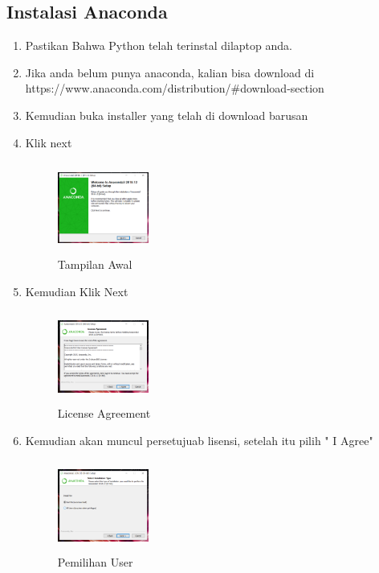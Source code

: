 \subsection{Instalasi Anaconda}
\begin{enumerate}
    \item Pastikan Bahwa Python telah terinstal dilaptop anda.
    \item Jika anda belum punya anaconda, kalian bisa download di https://www.anaconda.com/distribution/#download-section
    \item Kemudian buka installer yang telah di download barusan
    \item Klik next
    \begin{figure}[!htbp]
        \centering
        \includegraphics[width=3cm,height=3cm]{figures/1.png}
        \caption{Tampilan Awal}
        \label{awal}
        \end{figure}

    \item Kemudian Klik Next
    \begin{figure}[!htbp]
        \centering
        \includegraphics[width=3cm,height=3cm]{figures/2.png}
        \caption{License Agreement}
        \label{License}
        \end{figure}

    \item Kemudian akan muncul persetujuab lisensi, setelah itu pilih " I Agree"
    \begin{figure}[!htbp]
        \centering
        \includegraphics[width=3cm,height=3cm]{figures/3.png}
        \caption{Pemilihan User}
        \label{User}
        \end{figure}


\end{enumerate}
